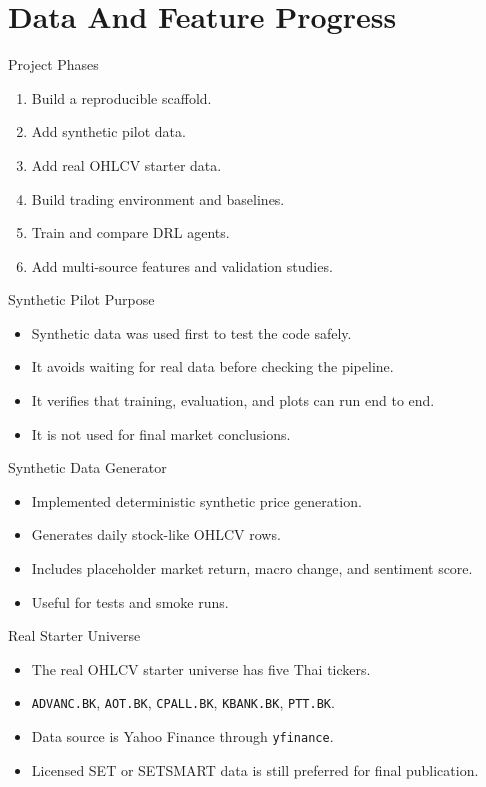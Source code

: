 \documentclass[aspectratio=43,10pt]{beamer}
\begin{document}
\section{Data And Feature Progress}

\begin{frame}{Project Phases}
\begin{enumerate}
  \item Build a reproducible scaffold.
  \item Add synthetic pilot data.
  \item Add real OHLCV starter data.
  \item Build trading environment and baselines.
  \item Train and compare DRL agents.
  \item Add multi-source features and validation studies.
\end{enumerate}
\end{frame}

\begin{frame}{Synthetic Pilot Purpose}
\begin{itemize}
  \item Synthetic data was used first to test the code safely.
  \item It avoids waiting for real data before checking the pipeline.
  \item It verifies that training, evaluation, and plots can run end to end.
  \item It is not used for final market conclusions.
\end{itemize}
\end{frame}

\begin{frame}{Synthetic Data Generator}
\begin{itemize}
  \item Implemented deterministic synthetic price generation.
  \item Generates daily stock-like OHLCV rows.
  \item Includes placeholder market return, macro change, and sentiment score.
  \item Useful for tests and smoke runs.
\end{itemize}
\end{frame}

\begin{frame}{Real Starter Universe}
\begin{itemize}
  \item The real OHLCV starter universe has five Thai tickers.
  \item \texttt{ADVANC.BK}, \texttt{AOT.BK}, \texttt{CPALL.BK}, \texttt{KBANK.BK}, \texttt{PTT.BK}.
  \item Data source is Yahoo Finance through \texttt{yfinance}.
  \item Licensed SET or SETSMART data is still preferred for final publication.
\end{itemize}
\end{frame}
\end{document}
